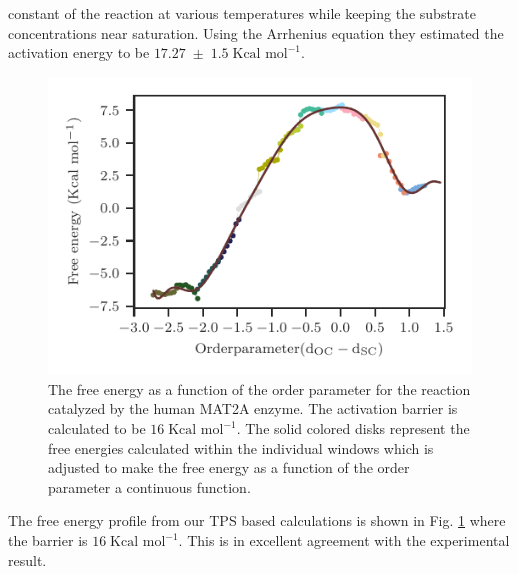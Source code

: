 \documentclass[journal=jpcbfk,manuscript=article,layout=traditional]{achemso}
\begin{document}
constant of the reaction at various temperatures while keeping the 
substrate concentrations near saturation. Using the Arrhenius equation 
they estimated the activation energy to be $17.27\;\pm\;1.5\;
\text{Kcal mol}^{-1}$.
\begin{figure}
\includegraphics[scale=1.0]{figures/mat2a-fenergy.pdf}
\caption{The free energy as a function of the order 
parameter for the reaction catalyzed
by the human MAT2A enzyme. The activation barrier is 
calculated to be $16\;\text{Kcal mol}^{-1}$. The solid colored disks represent the free energies 
calculated within the individual windows which is adjusted to make the free energy as a function 
of the order parameter a continuous function.}
\label{fig:mat2a-fenergy}
\end{figure}
The free energy profile from our TPS based calculations is shown in 
Fig. \ref{fig:mat2a-fenergy} where the barrier is $16\;\text{Kcal mol}^{-1}$.
This is in excellent agreement with the experimental result.  
\end{document}
